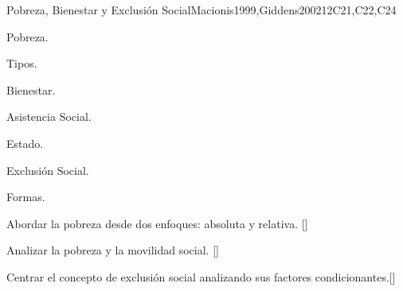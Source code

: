\begin{syllabus}
\begin{unit}{}{Pobreza, Bienestar y Exclusión Social}{Macionis1999,Giddens2002}{12}{C21,C22,C24}
\begin{topics}
    \item Pobreza.
    \begin{subtopics}
	    \item Tipos.
    \end{subtopics}
    \item Bienestar.
    \begin{subtopics}
	    \item Asistencia Social.
	    \item Estado.
    \end{subtopics}
    \item Exclusión Social.
    \begin{subtopics}
	    \item Formas.
    \end{subtopics}
\end{topics}
\begin{learningoutcomes}
	\item Abordar la pobreza desde dos enfoques: absoluta y relativa. [\Familiarity]
	\item Analizar la pobreza y la movilidad social. [\Familiarity]
	\item Centrar el concepto de exclusión social analizando sus factores condicionantes.[\Familiarity]
\end{learningoutcomes}
\end{unit}



\begin{coursebibliography}
\end{coursebibliography}

\end{syllabus}

